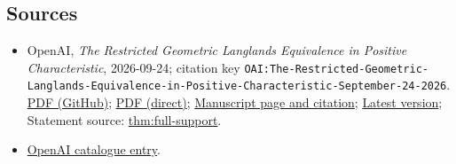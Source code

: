 \documentclass[11pt]{article}
\begin{document}
\subsection{Sources}
\begin{itemize}
\item OpenAI, \emph{The Restricted Geometric Langlands Equivalence in Positive Characteristic}, 2026-09-24; citation key \texttt{OAI:The-Restricted-Geometric-Langlands-Equivalence-in-Positive-Characteristic-September-24-2026}. \href{https://github.com/openai/math/blob/adc7f1241b42e322a6451854ab7e4b4c146bf78a/preprints/The-Restricted-Geometric-Langlands-Equivalence-in-Positive-Characteristic-September-24-2026/paper.pdf}{PDF (GitHub)}; \href{https://github.com/openai/math/raw/adc7f1241b42e322a6451854ab7e4b4c146bf78a/preprints/The-Restricted-Geometric-Langlands-Equivalence-in-Positive-Characteristic-September-24-2026/paper.pdf}{PDF (direct)}; \href{https://github.com/openai/math/blob/adc7f1241b42e322a6451854ab7e4b4c146bf78a/preprints/The-Restricted-Geometric-Langlands-Equivalence-in-Positive-Characteristic-September-24-2026/README.md}{Manuscript page and citation}; \href{https://github.com/openai/math/blob/main/preprints/The-Restricted-Geometric-Langlands-Equivalence-in-Positive-Characteristic-September-24-2026/paper.pdf}{Latest version}; Statement source: \href{https://github.com/openai/math/blob/adc7f1241b42e322a6451854ab7e4b4c146bf78a/preprints/The-Restricted-Geometric-Langlands-Equivalence-in-Positive-Characteristic-September-24-2026/build/sections/01-introduction.tex\#L186}{thm:full-support}.
\item \href{https://github.com/openai/math/blob/adc7f1241b42e322a6451854ab7e4b4c146bf78a/CONTENTS.md}{OpenAI catalogue entry}.
\end{itemize}
\end{document}
